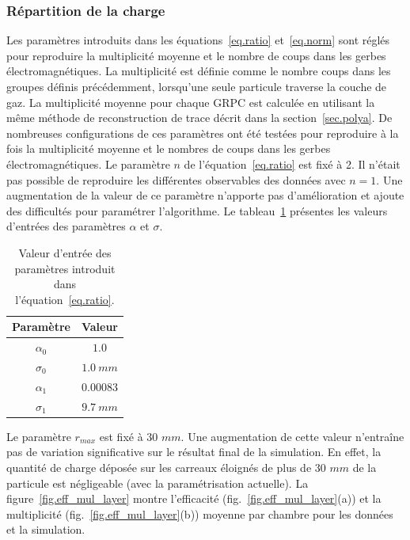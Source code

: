 \subsubsection{Répartition de la charge}
Les paramètres introduits dans les équations~\ref{eq.ratio} et~\ref{eq.norm} sont réglés pour reproduire la multiplicité moyenne et le nombre de coups dans les gerbes électromagnétiques. La multiplicité est définie comme le nombre coups dans les groupes définis précédemment, lorsqu'une seule particule traverse la couche de gaz. La multiplicité moyenne pour chaque GRPC est calculée en utilisant la même méthode de reconstruction de trace décrit dans la section~\ref{sec.polya}. De nombreuses configurations de ces paramètres ont été testées pour reproduire à la fois la multiplicité moyenne et le nombres de coups dans les gerbes électromagnétiques. Le paramètre $n$ de l'équation~\ref{eq.ratio} est fixé à 2. Il n'était pas possible de reproduire les différentes observables des données avec $n=1$. Une augmentation de la valeur de ce paramètre n'apporte pas d'amélioration et ajoute des difficultés pour paramétrer l'algorithme. Le tableau~\ref{tab.splitting} présentes les valeurs d'entrées des paramètres $\alpha$ et $\sigma$.
\begin{table}[!ht]
  \begin{center}
    \begin{tabular}{c|c}
      Paramètre & Valeur\\
      \hline
      $\alpha_0$ & $1.0$\\
      $\sigma_0$ & $1.0~mm$\\
      $\alpha_1$ & $0.00083$\\
      $\sigma_1$ & $9.7~mm$\\
    \end{tabular}
  \end{center}
  \caption{Valeur d'entrée des paramètres introduit dans l'équation~\ref{eq.ratio}.}
  \label{tab.splitting}
\end{table}
Le paramètre $r_{max}$ est fixé à 30 $mm$. Une augmentation de cette valeur n’entraîne pas de variation significative sur le résultat final de la simulation. En effet, la quantité de charge déposée sur les carreaux éloignés de plus de 30 $mm$ de la particule est négligeable (avec la paramétrisation actuelle). La figure~\ref{fig.eff_mul_layer} montre l'efficacité (fig.~\ref{fig.eff_mul_layer}(a)) et la multiplicité (fig.~\ref{fig.eff_mul_layer}(b)) moyenne par chambre pour les données et la simulation.
